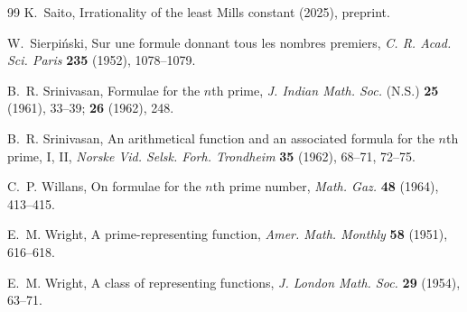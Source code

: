 \documentclass[11pt,reqno]{amsart}
\theoremstyle{blueplain}
\numberwithin{equation}{section}
\begin{document}
\begin{thebibliography}{99}
	K.~Saito, Irrationality of the least Mills constant (2025), preprint.
	
	W.~Sierpi\'nski, Sur une formule donnant tous les nombres premiers,
	\emph{C. R. Acad. Sci. Paris} \textbf{235} (1952), 1078--1079.
	
	B.~R. Srinivasan, Formulae for the $n$th prime, \emph{J. Indian Math.
		Soc.} (N.S.) \textbf{25} (1961), 33--39; \textbf{26} (1962), 248.
	
	B.~R. Srinivasan, An arithmetical function and an associated formula for
	the $n$th prime, I, II, \emph{Norske Vid. Selsk. Forh. Trondheim}
	\textbf{35} (1962), 68--71, 72--75.
	
	C.~P. Willans, On formulae for the $n$th prime number, \emph{Math. Gaz.}
	\textbf{48} (1964), 413--415.
	
	E.~M. Wright, A prime-representing function, \emph{Amer. Math. Monthly}
	\textbf{58} (1951), 616--618.
	
	E.~M. Wright, A class of representing functions, \emph{J. London Math.
		Soc.} \textbf{29} (1954), 63--71.
	
\end{thebibliography}
\end{document}
